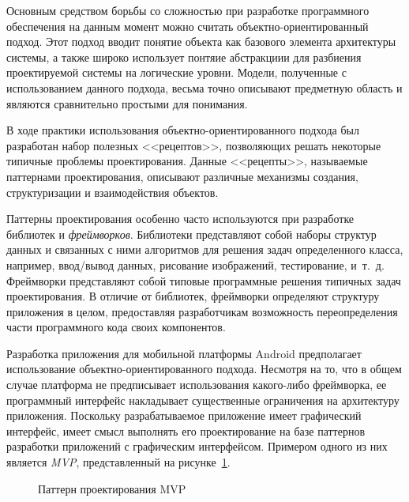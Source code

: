 Основным средством борьбы со сложностью при разработке программного обеспечения
на данным момент можно считать объектно-ориентированный подход.
Этот подход вводит понятие объекта как базового элемента
архитектуры системы, а также широко использует понтяие абстракциии для
разбиения проектируемой системы на логические уровни.
Модели, полученные с использованием данного подхода, весьма точно
описывают предметную область и являются сравнительно простыми для понимания.

В ходе практики использования объектно-ориентированного подхода
был разработан набор полезных <<рецептов>>,
позволяющих решать некоторые типичные проблемы проектирования.
Данные <<рецепты>>, называемые паттернами проектирования,
описывают различные механизмы создания, структуризации и взаимодействия объектов.

Паттерны проектирования особенно часто используются при разработке
библиотек и \textit{фреймворков}.
Библиотеки представляют собой наборы структур данных и
связанных с ними алгоритмов для решения задач определенного класса,
например, ввод/вывод данных, рисование изображений, тестирование, и~т.~д.
Фреймворки представляют собой типовые программные решения
типичных задач проектирования.
В отличие от библиотек, фреймворки определяют структуру приложения в целом,
предоставляя разработчикам возможность переопределения
части программного кода своих компонентов.

Разработка приложения для мобильной платформы Android предполагает использование
объектно-ориентированного подхода. Несмотря на то, что в общем случае
платформа не предписывает использования какого-либо фреймворка,
ее программный интерфейс накладывает существенные ограничения на
архитектуру приложения.
Поскольку разрабатываемое приложение имеет графический интерфейс,
имеет смысл выполнять его проектирование на базе паттернов
разработки приложений с графическим интерфейсом.
Примером одного из них является \textit{MVP},
представленный на рисунке~\ref{fig:design_mvp}.

\begin{figure}[h!]
  \centering
  \caption{Паттерн проектирования MVP}
  \label{fig:design_mvp}
\end{figure}

